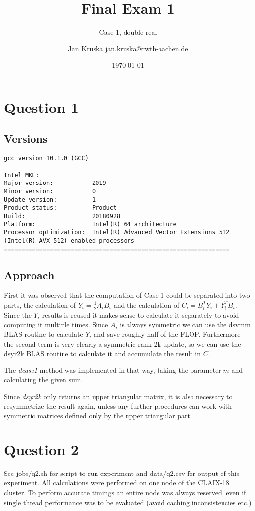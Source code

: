 \documentclass{scrartcl}
\title{Final Exam 1}
\subtitle{Case 1, double real}
\author{Jan Kruska jan.kruska@rwth-aachen.de}
\date{\today}
\begin{document}
\maketitle


\section{Question 1}
\subsection{Versions}
\begin{verbatim}
gcc version 10.1.0 (GCC)

Intel MKL:
Major version:           2019
Minor version:           0
Update version:          1
Product status:          Product
Build:                   20180928
Platform:                Intel(R) 64 architecture
Processor optimization:  Intel(R) Advanced Vector Extensions 512 (Intel(R) AVX-512) enabled processors
================================================================
\end{verbatim}

\subsection{Approach}

First it was observed that the computation of Case 1 could be separated into two parts, the calculation of $Y_i = \frac{1}{2}A_iB_i$ and the calculation of $C_i = B_i^TY_i + Y_i^TB_i$.
Since the $Y_i$ results is reused it makes sense to calculate it separately to avoid computing it multiple times.
Since $A_i$ is always symmetric we can use the dsymm BLAS routine to calculate $Y_i$ and save roughly half of the FLOP.
Furthermore the second term is very clearly a symmetric rank 2k update, so we can use the dsyr2k BLAS routine to calculate it and accumulate the result in $C$.

The \emph{dcase1} method was implemented in that way, taking the parameter $m$ and calculating the given sum.

Since \emph{dsyr2k} only returns an upper triangular matrix, it is also necessary to resymmetrize the result again, unless any further procedures can work with symmetric matrices defined only by the upper triangular part.

\section{Question 2}
See jobs/q2.sh for script to run experiment and data/q2.csv for output of this experiment.
All calculations were performed on one node of the CLAIX-18 cluster.
To perform accurate timings an entire node was always reserved, even if single thread performance was to be evaluated (avoid caching inconsistencies etc.)
\end{document}
